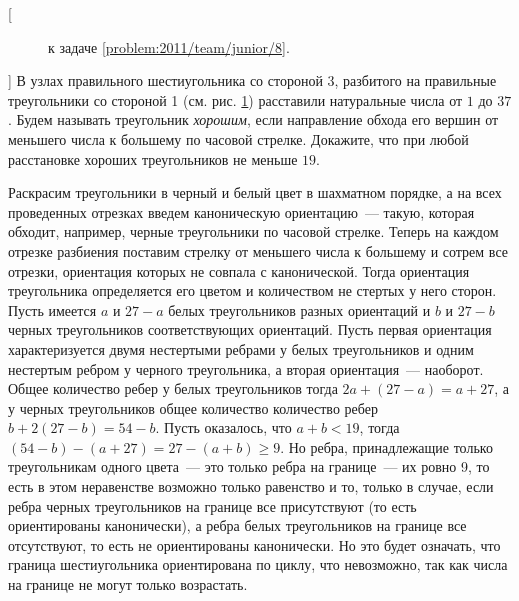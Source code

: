 [{\begin{figure}
\centering
\caption{к задаче \ref{problem:2011/team/junior/8}.}
\label{fig:problem:2011/team/junior/8}
\end{figure}}]%
\label{problem:2011/team/junior/8}%
В узлах правильного шестиугольника со стороной 3, разбитого на правильные
треугольники со стороной 1
(см. рис. \ref{fig:problem:2011/team/junior/8})
расставили натуральные числа от $1$ до $37$.
Будем называть треугольник \emph{хорошим}, если направление обхода его вершин от
меньшего числа к большему по часовой стрелке.
Докажите, что при любой расстановке хороших треугольников не меньше $19$.

\solution
Раскрасим треугольники в черный и белый цвет в шахматном порядке, а на всех
проведенных отрезках введем каноническую ориентацию~--- такую, которая обходит,
например, черные треугольники по часовой стрелке.
Теперь на каждом отрезке разбиения поставим стрелку от меньшего числа к
большему и сотрем все отрезки, ориентация которых не совпала с канонической.
Тогда ориентация треугольника определяется его цветом и количеством не стертых
у него сторон.
Пусть имеется $a$ и $27 - a$ белых треугольников разных ориентаций и $b$ и
$27 - b$ черных треугольников соответствующих ориентаций.
Пусть первая ориентация характеризуется двумя нестертыми ребрами у белых
треугольников и одним нестертым ребром у черного треугольника, а вторая
ориентация~--- наоборот.
Общее количество ребер у белых треугольников тогда
$2 a + (27 - a) = a + 27$, а у черных треугольников общее количество количество
ребер $b + 2 (27 - b) = 54 - b$.
Пусть оказалось, что $a + b < 19$, тогда
$(54 - b) - (a + 27) = 27 - (a + b) \geq 9$.
Но ребра, принадлежащие только треугольникам одного цвета~--- это только ребра
на границе~--- их ровно 9, то есть в этом неравенстве возможно только равенство
и то, только в случае, если ребра черных треугольников на границе все
присутствуют (то есть ориентированы канонически), а ребра белых треугольников
на границе все отсутствуют, то есть не ориентированы канонически.
Но это будет означать, что граница шестиугольника ориентирована по циклу, что
невозможно, так как числа на границе не могут только возрастать.


